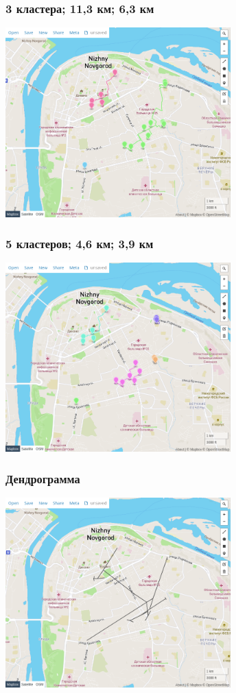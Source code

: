 \documentclass{beamer}
\begin{document}
\begin{frame}
	\frametitle{3 кластера; 11,3 км; 6,3 км}
	\centering
	\includegraphics[width=0.65\textwidth]{k3}
\end{frame}

\begin{frame}
	\frametitle{5 кластеров; 4,6 км; 3,9 км}
	\centering
	\includegraphics[width=0.65\textwidth]{k5}
\end{frame}

\begin{frame}
	\frametitle{Дендрограмма}
	\centering
	\includegraphics[width=0.65\textwidth]{dendrogram}
\end{frame}
\end{document}

